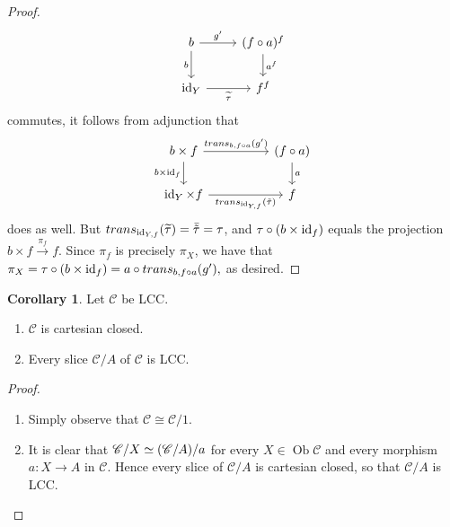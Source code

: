 \documentclass[10pt,letterpaper,cm]{nupset}
\theoremstyle{definition}
\theoremstyle{theorem}
\newtheorem{corollary}[definition]{Corollary}
\theoremstyle{remark}
\DeclareMathOperator{\ob}{Ob}
\newcommand{\0}{\mathbf{0}}
\newcommand{\1}{\mathbf{1}}
\newcommand{\2}{\mathbf{2}}
\renewcommand{\c}{\mathscr{C}}
\DeclareMathOperator{\idd}{id}
\DeclareMathOperator{\trans}{\mathnormal{trans}}
\newcommand{\be}{\begin{enumerate}}
\newcommand{\ee}{\end{enumerate}}
\begin{document}
\begin{proof}
\[\begin{tikzcd}
b \arrow[d, "b"'] \arrow[r, "g'"]      & (f\circ a)^f \arrow[d, "a^f"] \\
\idd_Y \arrow[r, "\widetilde{\tau}"'] & f^f                          
\end{tikzcd}
\] 
commutes, it follows from adjunction that
\[
\begin{tikzcd}[column sep =huge]
b \times f \arrow[d, "b \times \idd_f"'] \arrow[r, "{\trans_{b, f\circ a}(g')}"] & (f\circ a) \arrow[d, "a"] \\
\idd_Y \times f \arrow[r, "{\trans_{\idd_{Y, f}}(\tilde{\tau})}"']            & f                        
\end{tikzcd}
\] 
does as well. But $\trans_{\idd_{Y, f}}(\widetilde{\tau}) = \bar{\tilde{\tau}} = \tau$, and $\tau \circ \mleft(b \times \idd_f\mright)$ equals the projection $b \times f \overset{\pi_f}{\longrightarrow} f$. Since $\pi_f$ is precisely $\pi_X$, we have that  $\pi_X = \tau \circ \mleft(b \times \idd_f\mright) = a \circ \trans_{b, f\circ a}(g'), $ as desired. 
\end{proof}

\begin{corollary} Let $\c$ be LCC.
\be
\item $\c$ is cartesian closed.
\item Every slice $\c/A$ of $\c$ is LCC.
\ee
\end{corollary}
\begin{proof} $ $
\be
\item  Simply observe that $\c \cong \c/1$.
\item It is clear that $\c/X \simeq \mleft(\c/A\mright)/a$ for every $X\in \ob{\c}$ and every morphism $a: X\to A$ in $\c$. Hence every slice of $\c/A$ is cartesian closed, so that $\c/A$ is LCC.
\ee
\end{proof}
\end{document}
